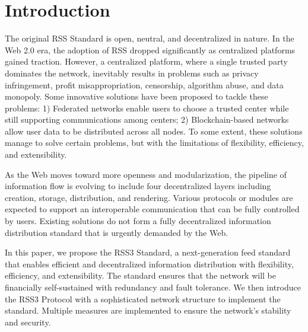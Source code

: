 \section{Introduction} 

The original RSS Standard is open, neutral, and decentralized in nature. In the Web 2.0 era, the adoption of RSS dropped significantly as centralized platforms gained traction. However, a centralized platform, where a single trusted party dominates the network, inevitably results in problems such as privacy infringement, profit misappropriation, censorship, algorithm abuse, and data monopoly. Some innovative solutions have been proposed to tackle these problems: 1) Federated networks enable users to choose a trusted center while still supporting communications among centers; 2) Blockchain-based networks allow user data to be distributed across all nodes. To some extent, these solutions manage to solve certain problems, but with the limitations of flexibility, efficiency, and extensibility.

As the Web moves toward more openness and modularization, the pipeline of information flow is evolving to include four decentralized layers including creation, storage, distribution, and rendering. Various protocols or modules are expected to support an interoperable communication that can be fully controlled by users. Existing solutions do not form a fully decentralized information distribution standard that is urgently demanded by the Web.

In this paper, we propose the RSS3 Standard, a next-generation feed standard that enables efficient and decentralized information distribution with flexibility, efficiency, and extensibility. The standard ensures that the network will be financially self-sustained with redundancy and fault tolerance. We then introduce the RSS3 Protocol with a sophisticated network structure to implement the standard. Multiple measures are implemented to ensure the network's stability and security. 

